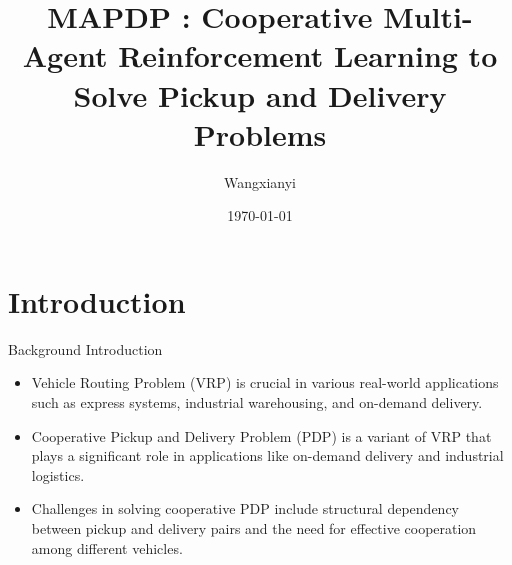 \documentclass{beamer}
\author{Wangxianyi}
\title{MAPDP : \newline Cooperative Multi-Agent Reinforcement Learning to Solve Pickup and
Delivery Problems}
\institute{LZU}
\date{\today}
\begin{document}
\kaishu
\begin{frame}
	\titlepage
\end{frame}

\begin{frame}
	\tableofcontents[sectionstyle=show,subsectionstyle=show/shaded/hide,subsubsectionstyle=show/shaded/hide]
\end{frame}


\section{Introduction}

\begin{frame}{Background Introduction}
	\begin{itemize}
		\item Vehicle Routing Problem (VRP) is crucial in various real-world applications such as express systems, industrial warehousing, and on-demand delivery.
		\item Cooperative Pickup and Delivery Problem (PDP) is a variant of VRP that plays a significant role in applications like on-demand delivery and industrial logistics.
		\item Challenges in solving cooperative PDP include structural dependency between pickup and delivery pairs and the need for effective cooperation among different vehicles.
	\end{itemize}
\end{frame}

\end{document}
